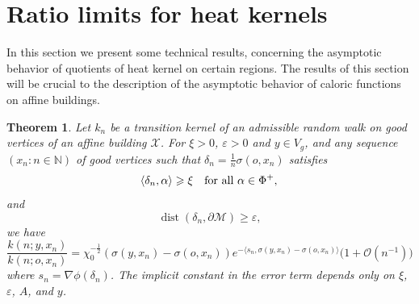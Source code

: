 \documentclass[11pt]{amsart}
\newcommand{\NN}{\mathbb{N}}
\newcommand{\calO}{\mathcal{O}}
\newcommand{\scrX}{\mathscr{X}}
\newcommand{\sprod}[2]{\langle {#1}, {#2} \rangle}
\newcommand{\dist}{\operatorname{dist}}
\theoremstyle{plain}
\newcounter{thm}
\newtheorem{theorem}{Theorem}[section]
\theoremstyle{definition}
\numberwithin{equation}{section}
\begin{document}
\section{Ratio limits for heat kernels}
\label{sec:3}
In this section we present some technical results, concerning the asymptotic behavior of quotients of heat kernel on
certain regions. The results of this section will be crucial to the description of the asymptotic behavior of caloric functions 
on affine buildings. 
\begin{theorem}
	\label{thm:4}
	Let $k_n$ be a transition kernel of an admissible random walk on good vertices of an affine building $\scrX$.
	For $\xi > 0$, $\varepsilon > 0$ and $y \in V_g$, and any sequence $(x_n : n \in \NN)$ of good vertices such that
	$\delta_n = \tfrac{1}{n} \sigma(o, x_n)$ satisfies
	\begin{equation}
		\label{eq:46}
		\sprod{\delta_n}{\alpha} 
		\geqslant 
		\xi \quad\text{for all } \alpha\in \Phi^{+}, \\
	\end{equation}
	and
	\[
		\dist(\delta_n, \partial \mathcal{M}) \geqslant \varepsilon,
	\]
	we have
	\[ 
		\frac{k(n; y, x_n)}{k(n; o, x_n)}
		=\chi_0^{-\frac{1}{2}}(\sigma(y,x_n)-\sigma(o,x_n))
		e^{-\sprod{s_n}{\sigma(y,x_n)-\sigma(o,x_n)}} \big(1+\calO(n^{-1})\big)
	\]
	where $s_n=\nabla\phi(\delta_n)$. The implicit constant in the error term depends only on $\xi$, $\varepsilon$, $A$, 
	and $y$.
\end{theorem}
\end{document}
